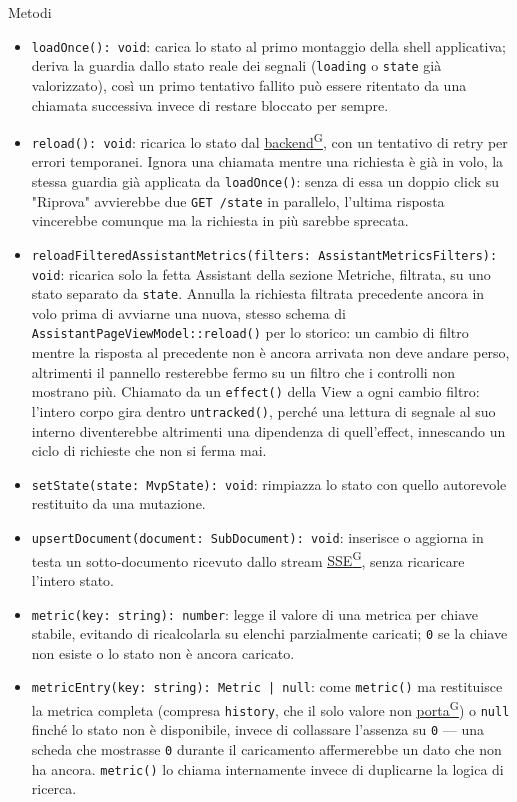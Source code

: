 \documentclass[a4paper,12pt]{article}
\providecommand{\glslink}[2]{\href{https://alittlebyte-19.github.io/Documentazione/glossario.html\#gls-#1}{\underline{#2}\textsuperscript{\scriptsize G}}}
\begin{document}
\begin{sloppypar}
Metodi
\begin{itemize}\raggedright
    \item \texttt{loadOnce(): void}: carica lo stato al primo montaggio della shell applicativa; deriva la guardia dallo stato reale dei segnali (\texttt{loading} o \texttt{state} già valorizzato), così un primo tentativo fallito può essere ritentato da una chiamata successiva invece di restare bloccato per sempre.
    \item \texttt{reload(): void}: ricarica lo stato dal \glslink{backend}{backend}, con un tentativo di retry per errori temporanei. Ignora una chiamata mentre una richiesta è già in volo, la stessa guardia già applicata da \texttt{loadOnce()}: senza di essa un doppio click su "Riprova" avvierebbe due \texttt{GET /state} in parallelo, l'ultima risposta vincerebbe comunque ma la richiesta in più sarebbe sprecata.
    \item \texttt{reloadFilteredAssistantMetrics(filters: AssistantMetricsFilters): void}: ricarica solo la fetta Assistant della sezione Metriche, filtrata, su uno stato separato da \texttt{state}. Annulla la richiesta filtrata precedente ancora in volo prima di avviarne una nuova, stesso schema di \texttt{AssistantPageViewModel::reload()} per lo storico: un cambio di filtro mentre la risposta al precedente non è ancora arrivata non deve andare perso, altrimenti il pannello resterebbe fermo su un filtro che i controlli non mostrano più. Chiamato da un \texttt{effect()} della View a ogni cambio filtro: l'intero corpo gira dentro \texttt{untracked()}, perché una lettura di segnale al suo interno diventerebbe altrimenti una dipendenza di quell'effect, innescando un ciclo di richieste che non si ferma mai.
    \item \texttt{setState(state: MvpState): void}: rimpiazza lo stato con quello autorevole restituito da una mutazione.
    \item \texttt{upsertDocument(document: SubDocument): void}: inserisce o aggiorna in testa un sotto-documento ricevuto dallo stream \glslink{sse-server-sent-events}{SSE}, senza ricaricare l'intero stato.
    \item \texttt{metric(key: string): number}: legge il valore di una metrica per chiave stabile, evitando di ricalcolarla su elenchi parzialmente caricati; \texttt{0} se la chiave non esiste o lo stato non è ancora caricato.
    \item \texttt{metricEntry(key: string): Metric | null}: come \texttt{metric()} ma restituisce la metrica completa (compresa \texttt{history}, che il solo valore non \glslink{porta}{porta}) o \texttt{null} finché lo stato non è disponibile, invece di collassare l'assenza su \texttt{0} — una scheda che mostrasse \texttt{0} durante il caricamento affermerebbe un dato che non ha ancora. \texttt{metric()} lo chiama internamente invece di duplicarne la logica di ricerca.
\end{itemize}


\end{sloppypar}
\end{document}
